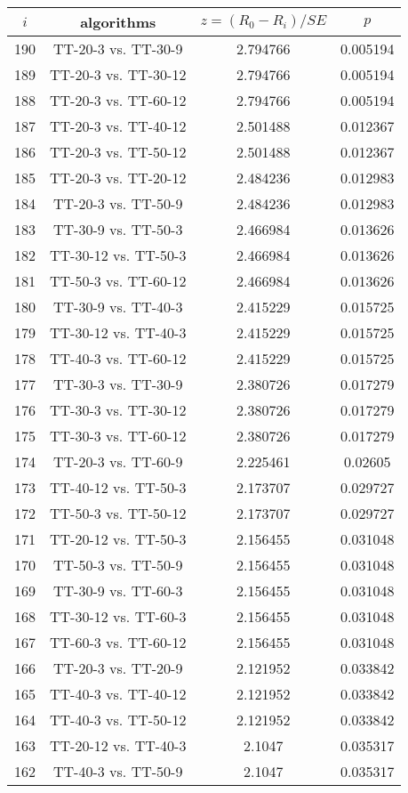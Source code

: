 \documentclass[a4paper,10pt]{article}
\begin{document}
\begin{landscape}
\begin{table}[!htp]
\centering\scriptsize
\begin{tabular}{cccc}
$i$&algorithms&$z=(R_0 - R_i)/SE$&$p$\\
\hline190&TT-20-3 vs. TT-30-9&2.794766&0.005194\\
189&TT-20-3 vs. TT-30-12&2.794766&0.005194\\
188&TT-20-3 vs. TT-60-12&2.794766&0.005194\\
187&TT-20-3 vs. TT-40-12&2.501488&0.012367\\
186&TT-20-3 vs. TT-50-12&2.501488&0.012367\\
185&TT-20-3 vs. TT-20-12&2.484236&0.012983\\
184&TT-20-3 vs. TT-50-9&2.484236&0.012983\\
183&TT-30-9 vs. TT-50-3&2.466984&0.013626\\
182&TT-30-12 vs. TT-50-3&2.466984&0.013626\\
181&TT-50-3 vs. TT-60-12&2.466984&0.013626\\
180&TT-30-9 vs. TT-40-3&2.415229&0.015725\\
179&TT-30-12 vs. TT-40-3&2.415229&0.015725\\
178&TT-40-3 vs. TT-60-12&2.415229&0.015725\\
177&TT-30-3 vs. TT-30-9&2.380726&0.017279\\
176&TT-30-3 vs. TT-30-12&2.380726&0.017279\\
175&TT-30-3 vs. TT-60-12&2.380726&0.017279\\
174&TT-20-3 vs. TT-60-9&2.225461&0.02605\\
173&TT-40-12 vs. TT-50-3&2.173707&0.029727\\
172&TT-50-3 vs. TT-50-12&2.173707&0.029727\\
171&TT-20-12 vs. TT-50-3&2.156455&0.031048\\
170&TT-50-3 vs. TT-50-9&2.156455&0.031048\\
169&TT-30-9 vs. TT-60-3&2.156455&0.031048\\
168&TT-30-12 vs. TT-60-3&2.156455&0.031048\\
167&TT-60-3 vs. TT-60-12&2.156455&0.031048\\
166&TT-20-3 vs. TT-20-9&2.121952&0.033842\\
165&TT-40-3 vs. TT-40-12&2.121952&0.033842\\
164&TT-40-3 vs. TT-50-12&2.121952&0.033842\\
163&TT-20-12 vs. TT-40-3&2.1047&0.035317\\
162&TT-40-3 vs. TT-50-9&2.1047&0.035317\\

\end{tabular}
\end{table}
\end{landscape}
\end{document}
